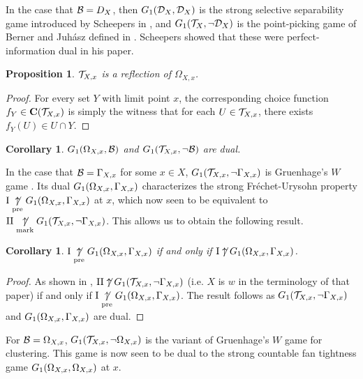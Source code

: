 \documentclass{amsart}
\theoremstyle{plain}
\newtheorem{corollary}[theorem]{Corollary}
\newtheorem{proposition}[theorem]{Proposition}
\theoremstyle{definition}
\theoremstyle{remark}
\theoremstyle{plain}
\theoremstyle{definition}
\theoremstyle{remark}
\begin{document}
In the case that \(\mathcal{B}=D_X\), then \(G_{1}(\mathcal{D}_X,\mathcal{D}_X)\) is the strong selective
separability game introduced by Scheepers 
in \cite{MR1711901}, and \(G_{1}(\mathcal{T}_X,\neg\mathcal{D}_X)\) is the
point-picking game of Berner and Juh\'asz defined in \cite{MR775687}. Scheepers showed that these
were perfect-information dual in his paper.

\begin{proposition}
  \(\mathcal{T}_{X,x}\) is a reflection of \(\Omega_{X,x}\).
\end{proposition}
\begin{proof}
  For every set \(Y\) with limit point \(x\), the corresponding choice function \(f_Y\in\mathbf C(\mathcal{T}_{X,x})\) is simply
  the witness that for each \(U\in\mathcal{T}_{X,x}\), there exists \(f_Y(U)\in U\cap Y\).
\end{proof}

\begin{corollary}
  \(G_{1}(\Omega_{X,x},\mathcal{B})\) and \(G_{1}(\mathcal{T}_{X,x},\neg\mathcal{B})\) are dual.
\end{corollary}

In the case that \(\mathcal{B}=\Gamma_{X,x}\) for some \(x\in X\), \(G_{1}(\mathcal{T}_{X,x},\neg\Gamma_{X,x})\)
is Gruenhage's \(W\) game \cite{MR0413049}. Its dual \(G_{1}(\Omega_{X,x},\Gamma_{X,x})\) characterizes
the strong Fr\'echet-Urysohn property \(\mathrm{I}\underset{\text{pre}}{\not\uparrow}G_{1}(\Omega_{X,x},\Gamma_{X,x})\) at \(x\),
which now seen to be equivalent to \(\mathrm{II}\underset{\text{mark}}{\not\uparrow}G_{1}(\mathcal{T}_{X,x},\neg\Gamma_{X,x})\).
This allows us to obtain the following result.

\begin{corollary}
  \(\mathrm{I}\underset{\text{pre}}{\not\uparrow}G_{1}(\Omega_{X,x},\Gamma_{X,x})\)
  if and only if
  \(\mathrm{I}\not\uparrow G_{1}(\Omega_{X,x},\Gamma_{X,x})\).
\end{corollary} 
\begin{proof}
  As shown in \cite{MR510910},
  \(\mathrm{II}\not\uparrow G_{1}(\mathcal{T}_{X,x},\neg\Gamma_{X,x})\) (i.e. \(X\) is \(w\) in the
  terminology of that paper)
  if and only if \(\mathrm{I}\underset{\text{pre}}{\not\uparrow}G_{1}(\Omega_{X,x},\Gamma_{X,x})\).
  The result follows as 
  \(G_{1}(\mathcal{T}_{X,x},\neg\Gamma_{X,x})\) and
  \(G_{1}(\Omega_{X,x},\Gamma_{X,x})\) are dual.
\end{proof}

For \(\mathcal{B}=\Omega_{X,x}\), \(G_{1}(\mathcal{T}_{X,x},\neg\Omega_{X,x})\) is the variant of
Gruenhage's \(W\) game for clustering. This game is now seen to be dual to the strong countable fan tightness game
\(G_{1}(\Omega_{X,x},\Omega_{X,x})\) at \(x\).
\end{document}
